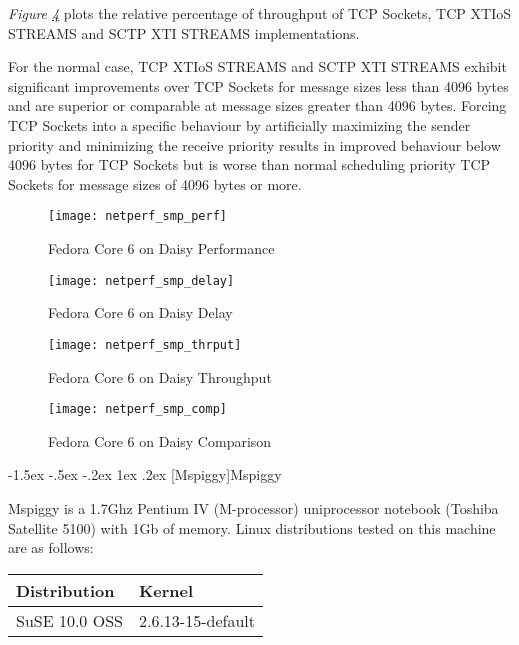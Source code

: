 \documentclass[letterpaper,final,notitlepage,twocolumn,10pt,twoside]{article}
\makeatletter
\let\normalsize = \small
\let\small = \footnotesize
\let\footnotesize = \scriptsize
\let\scriptsize = \tiny
\renewcommand\subsection{\@startsection{subsection}{2}{\z@}%
                                     {-1.5ex \@plus -.5ex \@minus -.2ex}%
                                     {1ex \@plus .2ex}%
                                     {\normalfont\normalsize\bfseries}}
\makeatother
\begin{document}
\begin{description}
\textit{Figure \ref{figure:smpcomp}}
plots the relative percentage of throughput of TCP Sockets, TCP XTIoS STREAMS and SCTP XTI STREAMS
implementations.

For the normal case, TCP XTIoS STREAMS and SCTP XTI STREAMS exhibit significant improvements over
TCP Sockets for message sizes less than 4096 bytes and are superior or comparable  at message sizes
greater than 4096 bytes.  Forcing TCP Sockets into a specific behaviour by artificially maximizing
the sender priority and minimizing the receive priority results in improved behaviour below 4096
bytes for TCP Sockets but is worse than normal scheduling priority TCP Sockets for message sizes of
4096 bytes or more.

\end{description}

\begin{figure}[p]
\center\texttt{[image: netperf\_smp\_perf]}
\caption[Fedora Core 6 on Daisy Performance]{Fedora Core 6 on Daisy Performance}
\label{figure:smpperf}
\end{figure}

\begin{figure}[p]
\center\texttt{[image: netperf\_smp\_delay]}
\caption[Fedora Core 6 on Daisy Delay]{Fedora Core 6 on Daisy Delay}
\label{figure:smpdly}
\end{figure}

\begin{figure}[p]
\center\texttt{[image: netperf\_smp\_thrput]}
\caption[Fedora Core 6 on Daisy Throughput]{Fedora Core 6 on Daisy Throughput}
\label{figure:smpthrput}
\end{figure}

\begin{figure}[pt]
\center\texttt{[image: netperf\_smp\_comp]}
\caption[Fedora Core 6 on Daisy Comparison]{Fedora Core 6 on Daisy Comparison}
\label{figure:smpcomp}
\end{figure}

\subsection[Mspiggy]{Mspiggy}

Mspiggy is a 1.7Ghz Pentium IV (M-processor) uniprocessor notebook (Toshiba Satellite 5100) with 1Gb
of memory.  Linux distributions tested on this machine are as follows:

\small
\setlength{\tabcolsep}{0.4em}
\setlength{\arraycolsep}{0.4em}
\begin{tabular}{ll}\\
Distribution & Kernel\\
\hline
SuSE 10.0 OSS & 2.6.13-15-default\\
\end{tabular}\\[1.0ex]
\normalsize
\end{document}

